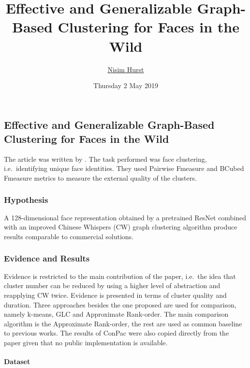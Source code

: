 \documentclass[]{article}
\title{Effective and Generalizable Graph-Based Clustering for Faces in the Wild}
\author{\href{mailto:langheran@gmail.com}{Nisim Hurst}}
\date{Thursday 2 May 2019}
\let\oldparagraph\paragraph
\renewcommand{\paragraph}[1]{\oldparagraph{#1}\mbox{}}
\begin{document}
\maketitle

\label{toc}

\hypertarget{effective-and-generalizable-graph-based-clustering-for-faces-in-the-wild}{%
\subsection{Effective and Generalizable Graph-Based Clustering for Faces in the Wild}\label{effective-and-generalizable-graph-based-clustering-for-faces-in-the-wild}}

The article was written by \autocite{chang2018}. The task performed was face clustering, i.e.~identifying unique face identities. They used Pairwise Fmeasure and BCubed Fmeasure metrics to measure the external quality of the clusters.

\hypertarget{hypothesis}{%
\subsubsection{Hypothesis}\label{hypothesis}}

A 128-dimensional face representation obtained by a pretrained ResNet combined with an improved Chinese Whispers (CW) graph clustering algorithm produce results comparable to commercial solutions.

\hypertarget{evidence-and-results}{%
\subsubsection{Evidence and Results}\label{evidence-and-results}}

Evidence is restricted to the main contribution of the paper, i.e.~the idea that cluster number can be reduced by using a higher level of abstraction and reapplying CW twice. Evidence is presented in terms of cluster quality and duration. Three approaches besides the one proposed are used for comparison, namely k-means, GLC and Approximate Rank-order. The main comparison algorithm is the Approximate Rank-order, the rest are used as common baseline to previous works. The results of ConPac were also copied directly from the paper given that no public implementation is available.

\hypertarget{dataset}{%
\paragraph{Dataset}\label{dataset}}
\end{document}
